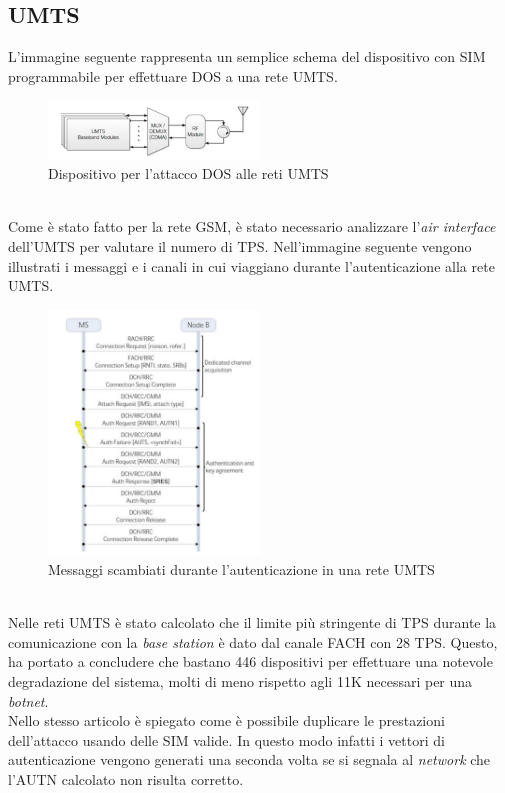 \clearpage

\subsection{UMTS}
L'immagine seguente rappresenta un semplice schema del dispositivo con SIM programmabile per effettuare DOS a una rete UMTS\cite{umts-dos}.
\begin{figure}[h]
    \centering
    \includegraphics[width=0.5\textwidth]{images/umts-dos-device.png}
    \caption{Dispositivo per l'attacco DOS alle reti UMTS\cite{umts-dos}}
\end{figure}\\
Come è stato fatto per la rete GSM, è stato necessario analizzare l'\textit{air interface} dell'UMTS per valutare il numero di TPS.
Nell'immagine seguente vengono illustrati i messaggi e i canali in cui viaggiano durante l'autenticazione alla rete UMTS.
\begin{figure}[h]
    \centering
    \includegraphics[width=0.5\textwidth]{images/umts-air-channel.png}
    \caption{Messaggi scambiati durante l'autenticazione in una rete UMTS\cite{umts-dos}}
\end{figure}\\
Nelle reti UMTS è stato calcolato che il limite più stringente di TPS durante la comunicazione con la \textit{base station} è dato dal canale FACH con 28 TPS.
Questo, ha portato a concludere che bastano 446 dispositivi per effettuare una notevole degradazione del sistema, molti di meno rispetto agli 11K necessari per una \textit{botnet}\cite{dos-imsi}.\\
Nello stesso articolo è spiegato come è possibile duplicare le prestazioni dell'attacco usando delle SIM valide. In questo modo infatti i vettori di autenticazione vengono generati una seconda volta se si segnala al
\textit{network} che l'AUTN calcolato non risulta corretto.
